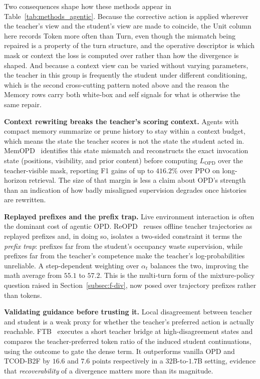 \documentclass{article} %
\begin{document}
Two consequences shape how these methods appear in Table~\ref{tab:methods_agentic}. Because the corrective action is applied wherever the teacher's view and the student's view are made to coincide, the Unit column here records Token more often than Turn, even though the mismatch being repaired is a property of the turn structure, and the operative descriptor is which mask or context the loss is computed over rather than how the divergence is shaped. And because a context view can be varied without varying parameters, the teacher in this group is frequently the student under different conditioning, which is the second cross-cutting pattern noted above and the reason the Memory rows carry both white-box and self signals for what is otherwise the same repair.

\textbf{Context rewriting breaks the teacher's scoring context.} Agents with compact memory summarize or prune history to stay within a context budget, which means the state the teacher scores is not the state the student acted in. MemOPD~\citep{2608.07068} identifies this state mismatch and reconstructs the exact invocation state (positions, visibility, and prior content) before computing $L_{\mathrm{OPD}}$ over the teacher-visible mask, reporting F1 gains of up to $416.2\%$ over PPO on long-horizon retrieval. The size of that margin is less a claim about OPD's strength than an indication of how badly misaligned supervision degrades once histories are rewritten.

\textbf{Replayed prefixes and the prefix trap.} Live environment interaction is often the dominant cost of agentic OPD. ReOPD~\citep{2607.04763} reuses offline teacher trajectories as replayed prefixes and, in doing so, isolates a two-sided constraint it terms the \emph{prefix trap}: prefixes far from the student's occupancy waste supervision, while prefixes far from the teacher's competence make the teacher's log-probabilities unreliable. A step-dependent weighting over $\alpha_t$ balances the two, improving the math average from $55.1$ to $57.2$. This is the multi-turn form of the mixture-policy question raised in Section~\ref{subsec:f-div}, now posed over trajectory prefixes rather than tokens.

\textbf{Validating guidance before trusting it.} Local disagreement between teacher and student is a weak proxy for whether the teacher's preferred action is actually reachable. FTB~\citep{2608.01953} executes a short teacher bridge at high-disagreement states and compares the teacher-preferred token ratio of the induced student continuations, using the outcome to gate the dense term. It outperforms vanilla OPD and TCOD-B2F by $16.6$ and $7.6$ points respectively in a $32$B-to-$1.7$B setting, evidence that \emph{recoverability} of a divergence matters more than its magnitude.
\end{document}

